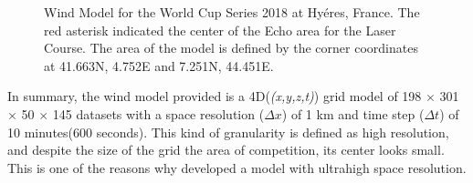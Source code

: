 \begin{figure} [hb!]
  \centering
  \caption{Wind Model for the World Cup Series 2018 at Hyéres, France. The red asterisk indicated the center of the Echo area for the Laser Course. The area of the model is defined by the corner coordinates at 41.663\degree N, 4.752\degree E and 7.251\degree N, 44.451\degree E.}
\label{fig:wind_model_FR} 
\end{figure}
In summary, the wind model provided is a 4D(\textit{(x,y,z,t)}) grid model of 198 $\times$ 301 $\times$ 50 $\times$ 145 datasets with a space resolution ($\Delta x$) of 1 km and time step ($\Delta t$) of 10 minutes(600 seconds). This kind of granularity is defined as high resolution, and despite the size of the grid the area of competition, its center looks small. This is one of the reasons why \cite{giannaros2018ultrahigh} developed a model with ultrahigh space resolution.\par  

